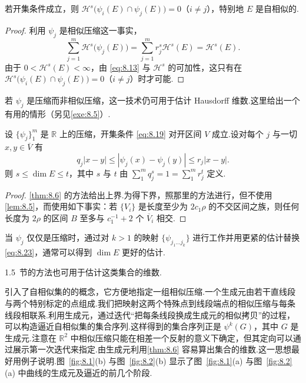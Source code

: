 \begin{corollary}\label{cor:8.7}
若开集条件成立，则 $\mathcal{H}^s\bigl(\psi_i(E)\cap\psi_j(E)\bigr)=0$（$i\neq j$），特别地 $E$ 是自相似的.
\end{corollary}

\begin{proof}
利用 $\psi_j$ 是相似压缩这一事实，
\[
  \sum_{j=1}^{m}\mathcal{H}^{s}\bigl(\psi_j(E)\bigr)=\sum_{j=1}^{m}r_j^{s}\mathcal{H}^{s}(E)=\mathcal{H}^{s}(E).
\]
由于 $0<\mathcal{H}^s(E)<\infty$，由 \eqref{eq:8.13} 与 $\mathcal{H}^s$ 的可加性，这只有在 $\mathcal{H}^s\bigl(\psi_i(E)\cap\psi_j(E)\bigr)=0$（$i\neq j$）时才可能.
\end{proof}

若 $\psi_j$ 是压缩而非相似压缩，这一技术仍可用于估计 Hausdorff 维数.这里给出一个有用的情形（另见\cref{exe:8.5}）.

\begin{theorem}\label{thm:8.8}
设 $\{\psi_j\}_{1}^{m}$ 是 $\mathbb{R}$ 上的压缩，开集条件 \eqref{eq:8.19} 对开区间 $V$ 成立.设对每个 $j$ 与一切 $x,y\in\overline{V}$ 有
\begin{equation}\label{eq:8.23}
  q_{j}|x-y|\leq|\psi_{j}(x)-\psi_{j}(y)|\leq r_{j}|x-y|.
\end{equation}
则 $s\leq\dim E\leq t$，其中 $s$ 与 $t$ 由 $\sum_{1}^{m}q_j^{s}=1=\sum_{1}^{m}r_j^{t}$ 定义.
\end{theorem}

\begin{proof}
\cref{thm:8.6} 的方法给出上界.为得下界，照那里的方法进行，但不使用\cref{lem:8.5}，而使用如下事实：若 $\{V_i\}$ 是长度至少为 $2c_1\rho$ 的不交区间之族，则任何长度为 $2\rho$ 的区间 $B$ 至多与 $c_1^{-1}+2$ 个 $\overline{V}_i$ 相交.
\end{proof}

当 $\psi_j$ 仅仅是压缩时，通过对 $k>1$ 的映射 $\{\psi_{j_1\ldots j_k}\}$ 进行工作并用更紧的估计替换 \eqref{eq:8.23}，通常可以得到 $\dim E$ 更好的估计.

1.5~节的方法也可用于估计这类集合的维数.

\textcite{mandelbrot1982} 引入了自相似集的的概念，它方便地指定一组相似压缩.一个生成元由若干直线段与两个特别标定的点组成.我们把映射这两个特殊点到线段端点的相似压缩与每条线段相联系.利用生成元，通过迭代``把每条线段换成生成元的相似拷贝''的过程，可以构造逼近自相似集的集合序列.这样得到的集合序列正是 $\psi^k(G)$，其中 $G$ 是生成元.注意在 $\mathbb{R}^2$ 中相似压缩只能在相差一个反射的意义下确定，但其定向可以通过展示第一次迭代来指定.由生成元利用\cref{thm:8.6} 容易算出集合的维数.这一思想最好用例子说明.图~\ref{fig:8.1}(b) 与图~\ref{fig:8.2}(b) 显示了图~\ref{fig:8.1}(a) 与图~\ref{fig:8.2}(a) 中曲线的生成元及逼近的前几个阶段.

